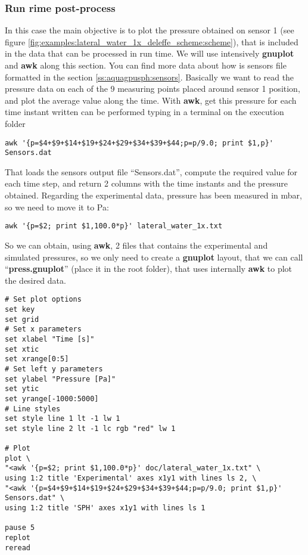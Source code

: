 \subsubsection{Run rime post-process}
\label{sss:example:lateral_water_1x_deleffe:postprocess:gnuplot}
%
In this case the main objective is to plot the pressure obtained on sensor 1 (see figure
\ref{fig:examples:lateral_water_1x_deleffe_scheme:scheme}), that is included in the data that can be processed
in run time. We will use intensively \textbf{gnuplot} and \textbf{awk} along this section.\rc
%
You can find more data about how is sensors file formatted in the section \ref{ss:aquagpusph:sensors}. Basically
we want to read the pressure data on each of the 9 measuring points placed around sensor 1 position, and plot
the average value along the time. With \textbf{awk}, get this pressure for each time instant written can be
performed typing in a terminal on the execution folder
%
\begin{verbatim}
awk '{p=$4+$9+$14+$19+$24+$29+$34+$39+$44;p=p/9.0; print $1,p}' Sensors.dat
\end{verbatim}
%
That loads the sensors output file ``Sensors.dat'', compute the required value for each time step, and return
2 columns with the time instants and the pressure obtained. Regarding the experimental data, pressure has been
measured in mbar, so we need to move it to Pa:
%
\begin{verbatim}
awk '{p=$2; print $1,100.0*p}' lateral_water_1x.txt
\end{verbatim}
%
So we can obtain, using \textbf{awk}, 2 files that contains the experimental and simulated pressures, so we only
need to create a \textbf{gnuplot} layout, that we can call ``\textbf{press.gnuplot}'' (place it in the root
folder), that uses internally \textbf{awk} to plot the desired data.
%
\begin{verbatim}
# Set plot options
set key
set grid
# Set x parameters
set xlabel "Time [s]"
set xtic
set xrange[0:5]
# Set left y parameters
set ylabel "Pressure [Pa]"
set ytic
set yrange[-1000:5000]
# Line styles
set style line 1 lt -1 lw 1
set style line 2 lt -1 lc rgb "red" lw 1

# Plot
plot \
"<awk '{p=$2; print $1,100.0*p}' doc/lateral_water_1x.txt" \
using 1:2 title 'Experimental' axes x1y1 with lines ls 2, \
"<awk '{p=$4+$9+$14+$19+$24+$29+$34+$39+$44;p=p/9.0; print $1,p}' Sensors.dat" \
using 1:2 title 'SPH' axes x1y1 with lines ls 1

pause 5
replot
reread
\end{verbatim}
